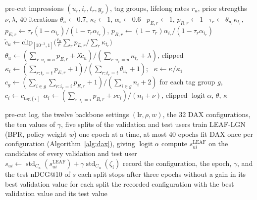 \begin{algorithm}[t]
\caption{DAX-EM on the pre-cut log}
\label{alg:dax}
\begin{algorithmic}[1]
\Require pre-cut impressions $(u_r,i_r,t_r,y_r)$, tag groups, lifelong rates $r_u$, prior strengths $\nu,\lambda$, 40 iterations
\State $\theta_u\gets 0.7$, $\kappa_t\gets 1$, $\alpha_i\gets 0.6$
   
    \ $p_{E,r}\gets 1$, $p_{R,r}\gets 1$
    \Else\ $\tau_r\gets\theta_{u_r}\kappa_{t_r}$, $p_{E,r}\gets\tau_r(1-\alpha_{i_r})/(1-\tau_r\alpha_{i_r})$,
      $p_{R,r}\gets(1-\tau_r)\alpha_{i_r}/(1-\tau_r\alpha_{i_r})$
    \EndIf
  \EndFor
  \State $\tilde c_u\gets\mathrm{clip}_{[10^{-3},1]}\bigl(\tfrac{r_u}{\bar r}\sum_r p_{E,r}/\sum_r\kappa_{t_r}\bigr)$ 
  \State $\theta_u\gets(\sum_{r:u_r=u}p_{E,r}+\lambda\tilde c_u)/(\sum_{r:u_r=u}\kappa_{t_r}+\lambda)$, clipped
  \State $\kappa_t\gets(\sum_{r:t_r=t}p_{E,r}+1)/(\sum_{r:t_r=t}\theta_{u_r}+1)$; \ $\kappa\gets\kappa/\kappa_1$
  \State $c_g\gets(\sum_{i\in g}\sum_{r:i_r=i}p_{R,r}+1)/(\sum_{i\in g}n_i+2)$ for each tag group $g$, \ $c_i\gets c_{\mathrm{tag}(i)}$
  \State $\alpha_i\gets(\sum_{r:i_r=i}p_{R,r}+\nu c_i)/(n_i+\nu)$, clipped
\EndFor
\State \Return $\operatorname{logit}\alpha$, $\theta$, $\kappa$
\end{algorithmic}
\end{algorithm}

\begin{algorithm}[t]
\caption{Training and selection of LEAF-LGN+DAX}
\label{alg:leaflgn}
\begin{algorithmic}[1]
\Require pre-cut log, the twelve backbone settings $(\mathrm{lr},\rho,w)$, the 32 DAX configurations, the ten values of $\gamma$, five splits of the validation and test users
  \State train LEAF-LGN (BPR, policy weight $w$) one epoch at a time, at most 40 epochs
  \State fit DAX once per configuration (Algorithm~\ref{alg:dax}), giving $\operatorname{logit}\alpha$
    \State compute $s^{\mathrm{LEAF}}_{ui}$ on the candidates of every validation and test user
      \State $s_{ui}\gets\operatorname{std}_{C_u}(s^{\mathrm{LEAF}}_{ui})+\gamma\operatorname{std}_{C_u}(\zeta_i)$ 
          \State record the configuration, the epoch, $\gamma$, and the test nDCG@10 of $s$
        \EndIf
      \EndFor
    \EndFor
    \State each split stops after three epochs without a gain in its best validation value
  \EndFor
\EndFor
\State \Return for each split the recorded configuration with the best validation value and its test value
\end{algorithmic}
\end{algorithm}

